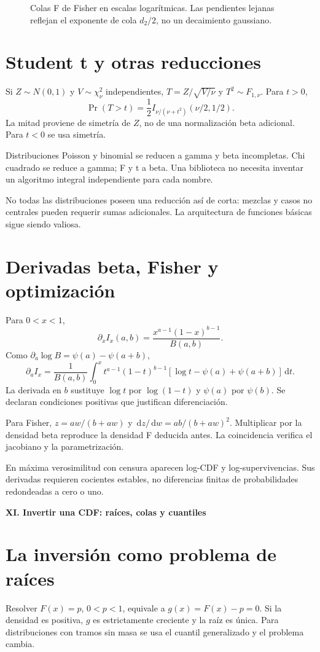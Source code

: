 \documentclass[11pt,a4paper]{article}
\newcommand{\dd}{\,\mathrm d}
\theoremstyle{definition}
\newcommand{\parte}[1]{\par\bigskip\Needspace{8\baselineskip}\begin{center}{\Large\bfseries\color{azul}#1}\end{center}}
\newcounter{problema}
\begin{document}
\begin{figure}[htbp]
\caption{Colas F de Fisher en escalas logarítmicas. Las pendientes lejanas reflejan el exponente de cola $d_2/2$, no un decaimiento gaussiano.}\label{fig:cdf-20}\end{figure}

\section{Student t y otras reducciones}
Si $Z\sim N(0,1)$ y $V\sim\chi^2_\nu$ independientes,
$T=Z/\sqrt{V/\nu}$ y $T^2\sim F_{1,\nu}$. Para $t>0$,
\[
\Pr(T>t)=\frac12I_{\nu/(\nu+t^2)}(\nu/2,1/2).
\]
La mitad proviene de simetría de $Z$, no de una normalización beta adicional. Para $t<0$ se usa simetría.

Distribuciones Poisson y binomial se reducen a gamma y beta incompletas. Chi cuadrado se reduce a gamma; F y t a beta. Una biblioteca no necesita inventar un algoritmo integral independiente para cada nombre.

No todas las distribuciones poseen una reducción así de corta: mezclas y casos no centrales pueden requerir sumas adicionales. La arquitectura de funciones básicas sigue siendo valiosa.

\section{Derivadas beta, Fisher y optimización}
Para $0<x<1$,
\[
\partial_xI_x(a,b)=\frac{x^{a-1}(1-x)^{b-1}}{B(a,b)}.
\]
Como $\partial_a\log B=\psi(a)-\psi(a+b)$,
\[
\partial_a I_x=
\frac1{B(a,b)}\int_0^x t^{a-1}(1-t)^{b-1}
[\log t-\psi(a)+\psi(a+b)]\dd t.
\]
La derivada en $b$ sustituye $\log t$ por $\log(1-t)$ y $\psi(a)$ por $\psi(b)$. Se declaran condiciones positivas que justifican diferenciación.

Para Fisher, $z=aw/(b+aw)$ y
$\dd z/\dd w=ab/(b+aw)^2$. Multiplicar por la densidad beta reproduce la densidad F deducida antes. La coincidencia verifica el jacobiano y la parametrización.

En máxima verosimilitud con censura aparecen log-CDF y log-supervivencias. Sus derivadas requieren cocientes estables, no diferencias finitas de probabilidades redondeadas a cero o uno.


\parte{XI. Invertir una CDF: raíces, colas y cuantiles}
\section{La inversión como problema de raíces}
Resolver $F(x)=p$, $0<p<1$, equivale a $g(x)=F(x)-p=0$. Si la densidad es positiva, $g$ es estrictamente creciente y la raíz es única. Para distribuciones con tramos sin masa se usa el cuantil generalizado y el problema cambia.
\end{document}
